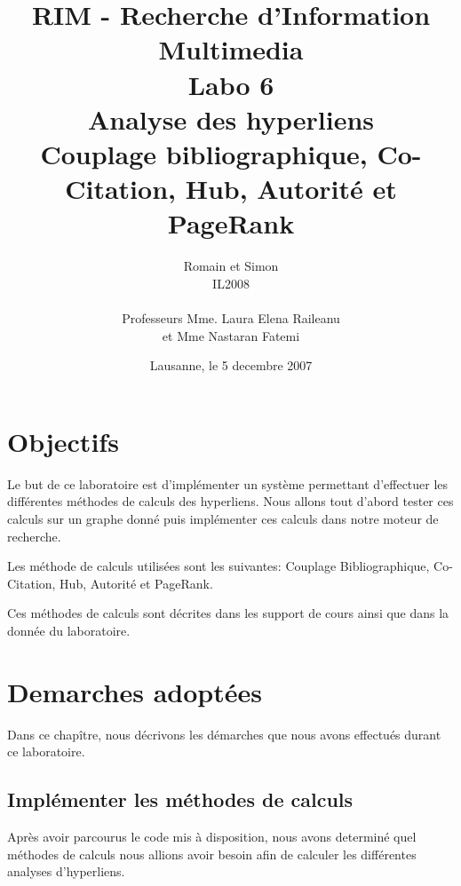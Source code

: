 \documentclass[a4paper, 11pt]{article}
\title{ %
\small{RIM - Recherche d'Information Multimedia} \\ \vspace{2cm}
\huge{Labo 6} \\ \vspace{1cm} 
Analyse des hyperliens\\
\small{Couplage bibliographique, Co-Citation, Hub, Autorité et PageRank}}
\author{Romain \bsc{de Wolff} et Simon \bsc{Hintermann}\\ IL2008 \\ \vspace{2cm} \\ Professeurs Mme. Laura Elena Raileanu \\ et Mme Nastaran Fatemi \vspace{2cm} 
}
\date{Lausanne, le 5 decembre 2007}  %
\begin{document}
\maketitle
\thispagestyle{empty} %
\newpage
 \setcounter{page}{1} 

{\setlength{\baselineskip}{1.2\baselineskip}}
\parskip=12pt
\section{Objectifs} 

Le but de ce laboratoire est d'implémenter un système permettant
d'effectuer les différentes méthodes de calculs des hyperliens. Nous allons
tout d'abord tester ces calculs sur un graphe donné puis implémenter ces
calculs dans notre moteur de recherche.

Les méthode de calculs utilisées sont les suivantes: Couplage Bibliographique, 
Co-Citation, Hub, Autorité et PageRank. 

Ces méthodes de calculs sont décrites dans les support de cours ainsi que dans 
la donnée du laboratoire.

\section{Demarches adoptées} 

Dans ce chapître, nous décrivons les démarches que nous avons effectués durant
ce laboratoire.

\subsection{Implémenter les méthodes de calculs}

Après avoir parcourus le code mis à disposition, nous avons determiné
quel méthodes de calculs nous allions avoir besoin afin de calculer les
différentes analyses d'hyperliens. 
\end{document}
